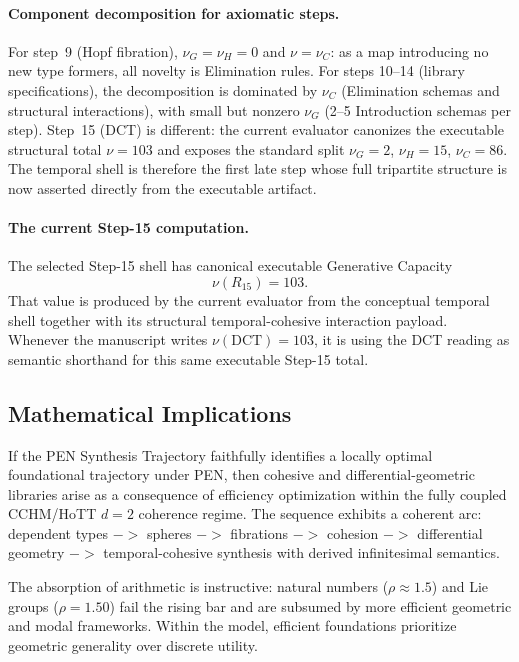 \documentclass[11pt,a4paper]{article}
\def\to{->}%
\theoremstyle{plain}
\theoremstyle{definition}
\theoremstyle{remark}
\begin{document}
\paragraph{Component decomposition for axiomatic steps.}
For step~9 (Hopf fibration), $\nu_G = \nu_H = 0$ and $\nu = \nu_C$: as a map introducing no new type formers, all novelty is Elimination rules.
For steps 10--14 (library specifications), the decomposition is dominated by $\nu_C$ (Elimination schemas and structural interactions), with small but nonzero $\nu_G$ (2--5 Introduction schemas per step).
Step~15 (DCT) is different: the current evaluator canonizes the executable structural total $\nu = 103$ and exposes the standard split $\nu_G=2$, $\nu_H=15$, $\nu_C=86$.
The temporal shell is therefore the first late step whose full tripartite structure is now asserted directly from the executable artifact.

\paragraph{The current Step-15 computation.}
The selected Step-15 shell has canonical executable Generative Capacity
\[
  \nu(R_{15}) = 103.
\]
That value is produced by the current evaluator from the conceptual temporal shell together with its structural temporal-cohesive interaction payload.
Whenever the manuscript writes $\nu(\mathrm{DCT})=103$, it is using the DCT reading as semantic shorthand for this same executable Step-15 total.

\subsection{Mathematical Implications}

If the PEN Synthesis Trajectory faithfully identifies a locally optimal foundational trajectory under PEN, then cohesive and differential-geometric libraries arise as a consequence of efficiency optimization within the fully coupled CCHM/HoTT $d = 2$ coherence regime.
The sequence exhibits a coherent arc: dependent types $\to$ spheres $\to$ fibrations $\to$ cohesion $\to$ differential geometry $\to$ temporal-cohesive synthesis with derived infinitesimal semantics.

The absorption of arithmetic is instructive: natural numbers ($\rho \approx 1.5$) and Lie groups ($\rho = 1.50$) fail the rising bar and are subsumed by more efficient geometric and modal frameworks.
Within the model, efficient foundations prioritize geometric generality over discrete utility.
\end{document}
